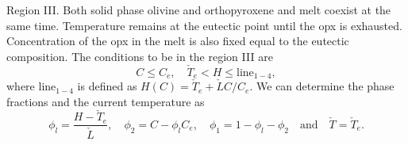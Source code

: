 \documentclass[usenames,dvipsnames,letterpaper,landscape,final]{slides}
\theoremstyle{definition}
\begin{document}
\begin{myslide}
Region III. 
Both solid phase olivine and orthopyroxene and melt coexist at the same time.
Temperature remains at the eutectic point until the opx is exhausted. 
Concentration of the opx in the melt is also fixed equal to the eutectic composition.
The conditions to be in the region III are
\begin{equation*}
		  C \leq C_e, \quad 
		  \check{T}_e < H \leq \text{line}_{1-4},
\end{equation*}
where $\text{line}_{1-4}$ is defined as $H(C) = \check{T}_e + \check{L} C/C_e$.
We can determine the phase fractions and the current temperature as
\begin{equation*}
		  \phi_l = \frac{H - \check{T}_e}{\check{L}}, \quad
		  \phi_2 = C - \phi_l C_e, \quad
		  \phi_1 = 1- \phi_l - \phi_2 \quad
		  \text{and} \quad \check{T} = \check{T}_e.
\end{equation*}

\end{myslide}
\end{document}
